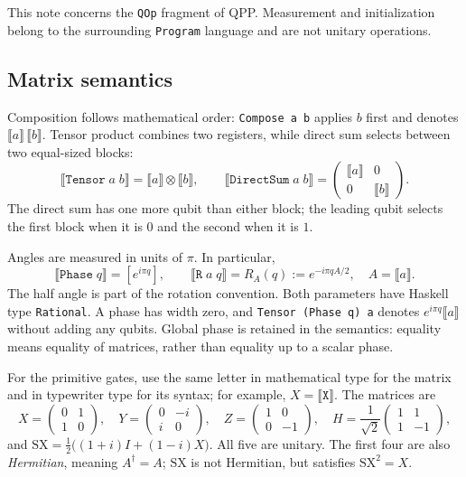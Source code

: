\documentclass[11pt,a4paper]{article}
\newcommand{\sem}[1]{\llbracket #1\rrbracket}
\newcommand{\code}[1]{\texttt{#1}}
\newcommand{\rot}[2]{R_{#1}(#2)}
\begin{document}
This note concerns the \code{QOp} fragment of QPP. Measurement and
initialization belong to the surrounding \code{Program} language and
are not unitary operations.

\subsection{Matrix semantics}

Composition follows mathematical order: \code{Compose a b} applies
$b$ first and denotes $\sem a\,\sem b$. Tensor product combines two
registers, while direct sum selects between two equal-sized blocks:
\[
  \sem{\code{Tensor}\;a\;b}=\sem a\otimes\sem b,
  \qquad
  \sem{\code{DirectSum}\;a\;b}
    =\begin{pmatrix}\sem a&0\\0&\sem b\end{pmatrix}.
\]
The direct sum has one more qubit than either block; the leading qubit
selects the first block when it is $0$ and the second when it is $1$.

Angles are measured in units of $\pi$. In particular,
\begin{equation}
  \sem{\code{Phase}\;q}=[e^{i\pi q}],
  \qquad
  \sem{\code{R}\;a\;q}=\rot A q:=e^{-i\pi qA/2},
  \quad A=\sem a.
  \label{eq:rotation}
\end{equation}
The half angle is part of the rotation convention. Both parameters
have Haskell type \code{Rational}. A phase has width zero, and
\code{Tensor (Phase q) a} denotes $e^{i\pi q}\sem a$ without adding
any qubits. Global phase is retained in the semantics: equality means
equality of matrices, rather than equality up to a scalar phase.

For the primitive gates, use the same letter in mathematical type for
the matrix and in typewriter type for its syntax; for example,
$X=\sem{\code{X}}$. The matrices are
\[
  X=\begin{pmatrix}0&1\\1&0\end{pmatrix},\quad
  Y=\begin{pmatrix}0&-i\\i&0\end{pmatrix},\quad
  Z=\begin{pmatrix}1&0\\0&-1\end{pmatrix},\quad
  H=\frac1{\sqrt2}\begin{pmatrix}1&1\\1&-1\end{pmatrix},
\]
and $\mathrm{SX}=\tfrac12\bigl((1+i)I+(1-i)X\bigr)$.
All five are unitary. The first four are also \emph{Hermitian}, meaning
$A^\dagger=A$; $\mathrm{SX}$ is not Hermitian, but satisfies
$\mathrm{SX}^2=X$.
\end{document}
